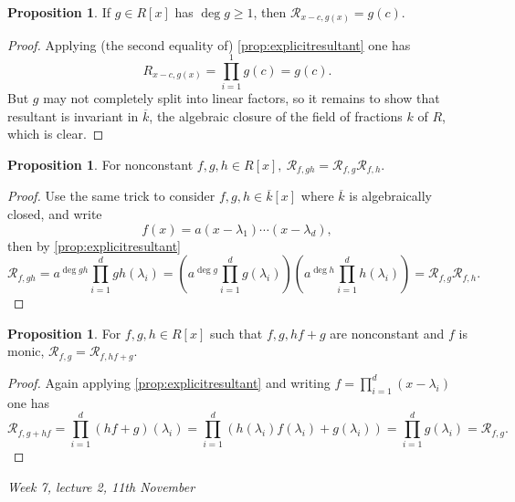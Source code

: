 \documentclass{article}
\newcommand{\re}{\mathcal{R}}
\theoremstyle{definition}
\newtheorem{prop}[defn]{Proposition}
\begin{document}
\begin{prop}
\label{prop:resoflinearwithgeneral}
If $g\in R[x]$ has $\deg g\geq 1$, then $\re_{x-c,g(x)}=g(c)$.
\end{prop}
\begin{proof}
Applying (the second equality of) \ref{prop:explicitresultant} one has
\[
R_{x-c,g(x)}=\prod_{i=1}^1g(c)=g(c).
\]
But $g$ may not completely split into linear factors, so it remains to show that resultant is invariant in $\overline k$, the algebraic closure of the field of fractions $k$ of $R$, which is clear.
\end{proof}

\begin{prop}
\label{prop:ResfghisResfgplusResfh}
For nonconstant $f,g,h\in R[x],\ \re_{f,gh}=\re_{f,g}\re_{f,h}$.
\end{prop}
\begin{proof}
Use the same trick to consider $f,g,h\in\overline k[x]$ where $\overline k$ is algebraically closed, and write
\[
f(x)=a(x-\lambda_1)\cdots (x-\lambda_d),
\]
then by \ref{prop:explicitresultant}
\[
\re_{f,gh}=a^{\deg gh}\prod_{i=1}^d gh(\lambda_i)=\left(a^{\deg g}\prod_{i=1}^d g(\lambda_i)\right)\left(a^{\deg h}\prod_{i=1}^d h(\lambda_i)\right)=\re_{f,g}\re_{f,h}.
\]
\end{proof}

\begin{prop}
\label{prop:ResfgisResfhgplusg}
For $f,g,h\in R[x]$ such that $f,g,hf+g$ are nonconstant and $f$ is monic, $\re_{f,g}=\re_{f,hf+g}$.
\end{prop}
\begin{proof}
Again applying \ref{prop:explicitresultant} and writing $f=\prod_{i=1}^d(x-\lambda_i)$ one has
\[
\re_{f,g+hf}=\prod_{i=1}^d (hf+g)(\lambda_i)=\prod_{i=1}^d (h(\lambda_i)f(\lambda_i)+g(\lambda_i))=\prod_{i=1}^d g(\lambda_i)=\re_{f,g}.
\]
\end{proof}

\begin{flushright}
\textit{Week 7, lecture 2, 11th November}
\end{flushright}
\end{document}

